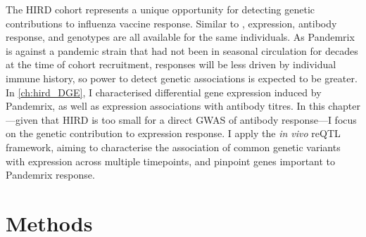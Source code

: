 The \gls{HIRD} cohort represents a unique opportunity for detecting genetic contributions to influenza vaccine response.
Similar to \textcite{franco2013IntegrativeGenomicAnalysis},
expression, antibody response, and genotypes are all available for the same individuals.
As Pandemrix is against a pandemic strain that had not been in seasonal circulation for decades at the time of cohort recruitment, 
responses will be less driven by individual immune history,
so power to detect genetic associations is expected to be greater.
In \cref{ch:hird_DGE}, I characterised differential gene expression induced by Pandemrix, as well as expression associations with antibody titres.
In this chapter---given that \gls{HIRD} is too small for a direct \gls{GWAS} of antibody response---I focus on the genetic contribution to expression response.
I apply the \textit{in vivo} \gls{reQTL} framework, 
aiming to characterise the association of common genetic variants with expression across multiple timepoints,
and pinpoint genes important to Pandemrix response.

\section{Methods}
\label{sec:hird_reQTL_methods}


